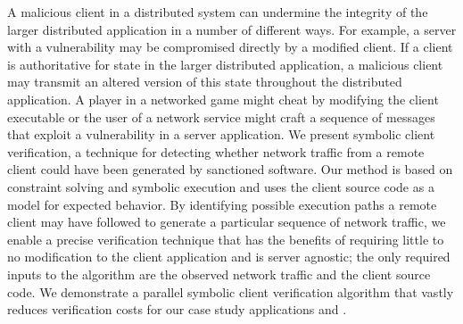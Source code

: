 A malicious client in a distributed system can undermine the integrity
of the larger distributed application in a number of different ways.
For example, a server with a vulnerability may be compromised directly
by a modified client. If a client is authoritative for state in the
larger distributed application, a malicious client may transmit an
altered version of this state throughout the distributed application.
A player in a networked game might cheat by modifying the client
executable or the user of a network service might craft a sequence of
messages that exploit a vulnerability in a server application. We
present symbolic client verification, a technique for detecting
whether network traffic from a remote client could have been generated
by sanctioned software. Our method is based on constraint solving and
symbolic execution and uses the client source code as a model for
expected behavior. By identifying possible execution paths a remote
client may have followed to generate a particular sequence of network
traffic, we enable a precise verification technique that has the
benefits of requiring little to no modification to the client
application and is server agnostic; the only required inputs to the
algorithm are the observed network traffic and the client source code.
We demonstrate  a parallel symbolic client verification algorithm that
vastly reduces verification costs for our case study applications
\xpilot and \tetrinet. 
